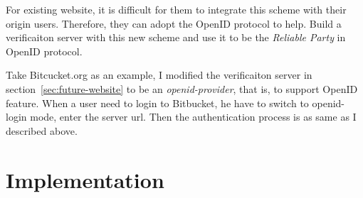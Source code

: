 \begin{CJK}{Bg5}{bsmi}
For existing website, it is difficult for them to integrate this scheme with their origin users. Therefore, they can adopt the OpenID protocol to help. Build a verificaiton server with this new scheme and use it to be the \emph{Reliable Party} in OpenID protocol.

Take Bitcucket.org as an example, I modified the verificaiton server in section~\ref{sec:future-website} to be an \emph{openid-provider}, that is, to support OpenID feature. When a user need to login to Bitbucket, he have to switch to openid-login mode, enter the server url. Then the authentication process is as same as I described above. 

\section{Implementation}

\end{CJK}